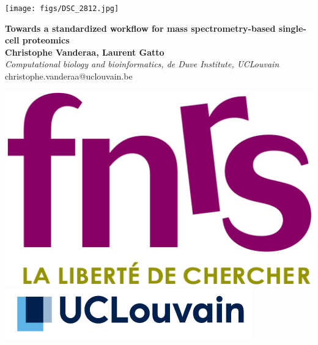 \documentclass{article}
\title{}
\author{}
\date{}
\begin{document}


\begin{center}
\colorbox{lgray}{
  \begin{minipage}{3.7cm}
    \texttt{[image: figs/DSC\_2812.jpg]}
  \end{minipage}
  \begin{minipage}{.72\textwidth}
    \begin{center}
      \vspace{0.4cm}
      \huge 
      \hspace{1cm}
      \noindent
      \textbf{Towards a standardized workflow for mass spectrometry-based single-cell proteomics} \\
      \vspace{0.4cm}
      \Large \textbf{Christophe Vanderaa, Laurent Gatto} \\
      \Large \textit{Computational biology and bioinformatics, de Duve Institute, UCLouvain } \\
      \vspace{0.4cm}
      \normalsize christophe.vanderaa@uclouvain.be \\
      \hspace{1cm}
    \end{center}
  \end{minipage}
  \begin{minipage}{3.7cm}
      \includegraphics[width=0.7\linewidth, right]{figs/fnrs.png} \\
      \vspace{0.5cm}
      \includegraphics[width=1.1\linewidth, right]{figs/ucl.png}
  \end{minipage}
}
\end{center}
\end{document}
